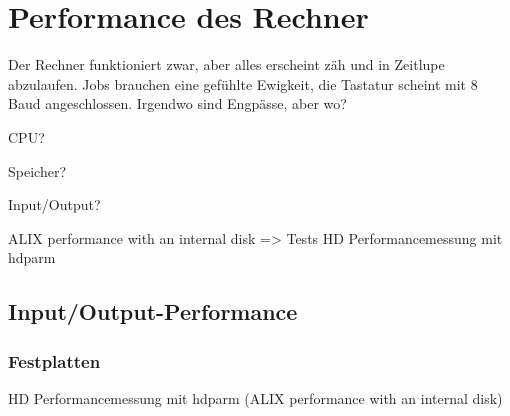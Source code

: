 \chapter{Performance des Rechner}
\label{cha:lokal-performance}

\begin{abstractsec}
  Der Rechner funktioniert zwar, aber alles erscheint zäh und in Zeitlupe
  abzulaufen. Jobs brauchen eine gefühlte Ewigkeit, die Tastatur scheint mit
  8 Baud angeschlossen. Irgendwo sind Engpässe, aber wo?
\end{abstractsec}

\begin{notes}
\item CPU?
\item Speicher?
\item Input/Output?
\item ALIX performance with an internal disk => Tests HD Performancemessung
  mit hdparm
\end{notes}

\section{Input/Output-Performance}
\label{sec:input-output-performance}


\subsection*{Festplatten}
\label{sec:performance-festplatten}

\begin{notes}
\item HD Performancemessung mit hdparm (ALIX performance with an
  internal disk)
\end{notes}



